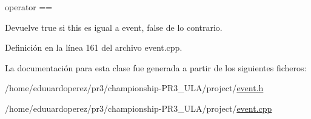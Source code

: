 operator == 

\begin{DoxyReturn}{Devuelve}
true si this es igual a event, false de lo contrario. 
\end{DoxyReturn}


Definición en la línea 161 del archivo event.\+cpp.



La documentación para esta clase fue generada a partir de los siguientes ficheros\+:\begin{DoxyCompactItemize}
\item 
/home/eduuardoperez/pr3/championship-\/\+P\+R3\+\_\+\+U\+L\+A/project/\hyperlink{event_8h}{event.\+h}\item 
/home/eduuardoperez/pr3/championship-\/\+P\+R3\+\_\+\+U\+L\+A/project/\hyperlink{event_8cpp}{event.\+cpp}\end{DoxyCompactItemize}
